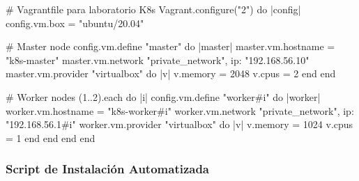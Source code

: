 \documentclass[11pt,a4paper]{article}
\begin{document}
\begin{commandbox}
\# Vagrantfile para laboratorio K8s
Vagrant.configure("2") do |config|
  config.vm.box = "ubuntu/20.04"
  
  # Master node
  config.vm.define "master" do |master|
    master.vm.hostname = "k8s-master"
    master.vm.network "private_network", ip: "192.168.56.10"
    master.vm.provider "virtualbox" do |v|
      v.memory = 2048
      v.cpus = 2
    end
  end
  
  # Worker nodes
  (1..2).each do |i|
    config.vm.define "worker#{i}" do |worker|
      worker.vm.hostname = "k8s-worker#{i}"
      worker.vm.network "private_network", ip: "192.168.56.1#{i}"
      worker.vm.provider "virtualbox" do |v|
        v.memory = 1024
        v.cpus = 1
      end
    end
  end
end
\end{commandbox}

\subsubsection{Script de Instalación Automatizada}
\end{document}
